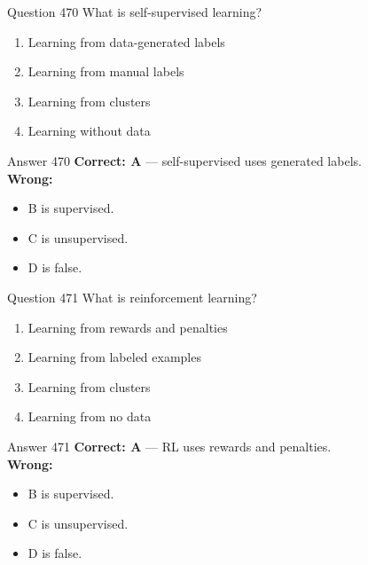 \documentclass[aspectratio=169,11pt]{beamer}
\begin{document}
	\begin{frame}{Question 470}
		What is self-supervised learning?
		\begin{enumerate}[label=\Alph*.]
			\item Learning from data-generated labels
			\item Learning from manual labels
			\item Learning from clusters
			\item Learning without data
		\end{enumerate}
	\end{frame}
	\begin{frame}{Answer 470}
		\textbf{Correct: A} --- self-supervised uses generated labels.\\
		\vspace{0.5em}
		\textbf{Wrong:}
		\begin{itemize}
			\item B is supervised.
			\item C is unsupervised.
			\item D is false.
		\end{itemize}
	\end{frame}
	
	\begin{frame}{Question 471}
		What is reinforcement learning?
		\begin{enumerate}[label=\Alph*.]
			\item Learning from rewards and penalties
			\item Learning from labeled examples
			\item Learning from clusters
			\item Learning from no data
		\end{enumerate}
	\end{frame}
	\begin{frame}{Answer 471}
		\textbf{Correct: A} --- RL uses rewards and penalties.\\
		\vspace{0.5em}
		\textbf{Wrong:}
		\begin{itemize}
			\item B is supervised.
			\item C is unsupervised.
			\item D is false.
		\end{itemize}
	\end{frame}
	
\end{document}
